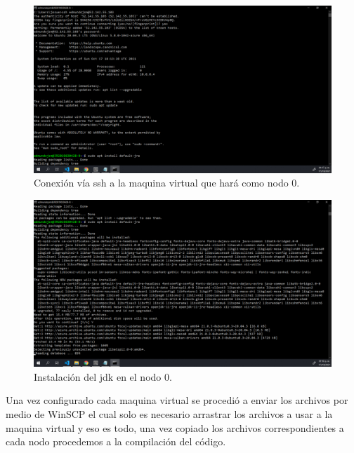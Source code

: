 \documentclass[11pt]{article}
\begin{document}
		\begin{figure}[H]
			\centering
			\includegraphics[scale=0.34]{resources/Nodo0ssh.png}
			\caption{Conexión vía ssh a la maquina virtual que hará como nodo 0. }\label{fig:picture}
		\end{figure}
		\begin{figure}[H]
			\centering
			\includegraphics[scale=0.34]{resources/instalarjava.png}
			\caption{Instalación del jdk en el nodo 0. }\label{fig:picture}
		\end{figure}
		Una vez configurado cada maquina virtual se procedió a enviar los archivos por medio de WinSCP el cual solo es necesario arrastrar los archivos a usar a la maquina virtual y eso es todo, una vez copiado los archivos correspondientes a cada nodo procedemos a la compilación del código.
\end{document}
